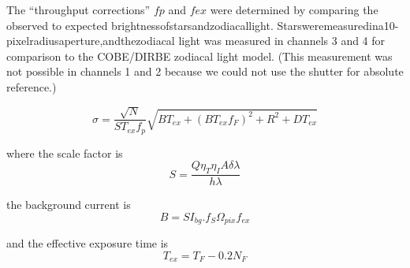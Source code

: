 \documentclass[11pt,a4paper]{article}
\begin{document}
The “throughput corrections” $fp$ and $fex$ were determined by comparing the observed to expected brightnessofstarsandzodiacallight. Starsweremeasuredina10-pixelradiusaperture,andthezodiacal light was measured in channels 3 and 4 for comparison to the COBE/DIRBE zodiacal light model. (This measurement was not possible in channels 1 and 2 because we could not use the shutter for absolute reference.)

\begin{equation}
  \sigma = \frac{\sqrt{N}}  {ST_{ex} f_{p}}  \sqrt{ B T_{ex} + (B T_{ex} f_{F})^{2} +R^{2} +DT_{ex}}
\end{equation}

where the scale factor is
\begin{equation}
  S = \frac{Q \eta_{T} \eta_{I} A \delta\lambda}{h\lambda}
\end{equation}

the background current is
\begin{equation}
  B = S I_{bg}. f_{S} \Omega_{pix} f_{ex}
\end{equation}

and the effective exposure time is
\begin{equation}
T_{ex} =T_{F} - 0.2N_{F}
\end{equation}
\end{document}
